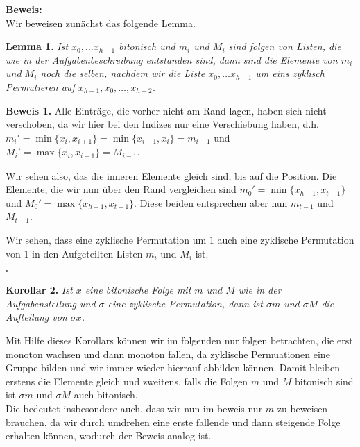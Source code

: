 \documentclass[11pt,a4paper,ngerman]{article}
\begin{document}
\noindent\textbf{Beweis:}\\

Wir beweisen zunächst das folgende Lemma.

\noindent\textbf{Lemma 1.} {\itshape Ist $x_0, \ldots x_{h-1}$ bitonisch und $m_i$ und $M_i$ sind folgen von Listen, die wie in
der Aufgabenbeschreibung entstanden sind, dann sind die Elemente von $m_i$ und $M_i$ noch die selben, nachdem wir die Liste $x_0, \ldots x_{h-1}$
um eins zyklisch Permutieren auf $x_{h-1}, x_0, \ldots, x_{h-2}$.
}

\noindent\textbf{Beweis 1.}
Alle Einträge, die vorher nicht am Rand lagen, haben sich nicht verschoben, da wir hier bei den Indizes nur eine Verschiebung haben,
d.h. $m_i' = \min \{x_i, x_{i+1}\} = \min \{x_{i-1}, x_i\} = m_{i-1}$ und $M_i' = \max \{ x_i, x_{i+1}\} = M_{i-1}$.

Wir sehen also, das die inneren Elemente gleich sind, bis auf die Position. Die Elemente, die wir nun über den Rand vergleichen sind
$m_0' = \min \{ x_{h-1}, x_{t-1} \}$ und $M_0' = \max \{ x_{h-1}, x_{t-1}\}$. Diese beiden entsprechen aber nun $m_{t-1}$ und $M_{t-1}$.

Wir sehen, dass eine zyklische Permutation um $1$ auch eine zyklische Permutation von $1$ in den Aufgeteilten Listen $m_i$ und $M_i$ ist.

\mbox{}\hfill$\square$

\noindent\textbf{Korollar 2.}{\itshape 
Ist $x$ eine bitonische Folge mit $m$ und $M$ wie in der Aufgabenstellung und $\sigma$ eine zyklische Permutation, dann
ist $\sigma m$ und $\sigma M$ die Aufteilung von $\sigma x$.
}

Mit Hilfe dieses Korollars können wir im folgenden nur folgen betrachten, die erst monoton wachsen und dann monoton fallen, da zyklische Permuationen eine Gruppe bilden und wir immer wieder hierrauf abbilden können. Damit bleiben erstens die Elemente gleich und zweitens, falls die Folgen $m$ und $M$ bitonisch sind ist $\sigma m$ und $\sigma M$ auch bitonisch.\\

Die bedeutet insbesondere auch, dass wir nun im beweis nur $m$ zu beweisen brauchen, da wir durch umdrehen eine erste fallende und dann steigende Folge erhalten können, wodurch der Beweis analog ist.
\end{document}
